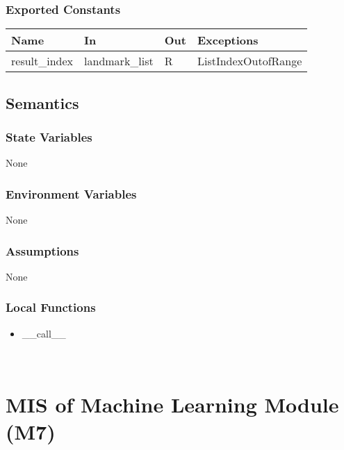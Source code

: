 \documentclass[12pt, titlepage]{article}
\begin{document}
\subsubsection{Exported Constants}

\begin{center}
\begin{tabular}{p{3cm} p{3cm} p{2cm} p{4cm}}
\hline
\textbf{Name} & \textbf{In} & \textbf{Out} & \textbf{Exceptions} \\
\hline
result_index & landmark_list & R & ListIndexOutofRange \\
\hline
\end{tabular}
\end{center}

\subsection{Semantics}

\subsubsection{State Variables}

None\\

\subsubsection{Environment Variables}

None\\

\subsubsection{Assumptions}

None\\

\subsubsection{Local Functions}
\begin{itemize}
\item \_\_call\_\_
\end{itemize}

\newpage
~\newpage

\section{MIS of Machine Learning Module (M7)} \label{M7}
\end{document}
